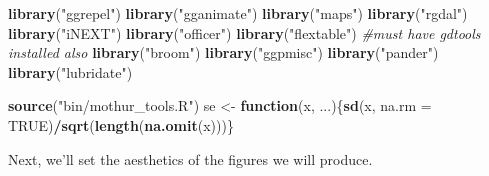 \documentclass[]{article}
\newenvironment{Shaded}{\begin{snugshade}}{\end{snugshade}}
\newcommand{\KeywordTok}[1]{\textcolor[rgb]{0.13,0.29,0.53}{\textbf{#1}}}
\newcommand{\DataTypeTok}[1]{\textcolor[rgb]{0.13,0.29,0.53}{#1}}
\newcommand{\StringTok}[1]{\textcolor[rgb]{0.31,0.60,0.02}{#1}}
\newcommand{\CommentTok}[1]{\textcolor[rgb]{0.56,0.35,0.01}{\textit{#1}}}
\newcommand{\OtherTok}[1]{\textcolor[rgb]{0.56,0.35,0.01}{#1}}
\newcommand{\ControlFlowTok}[1]{\textcolor[rgb]{0.13,0.29,0.53}{\textbf{#1}}}
\newcommand{\OperatorTok}[1]{\textcolor[rgb]{0.81,0.36,0.00}{\textbf{#1}}}
\newcommand{\NormalTok}[1]{#1}
\begin{document}
\begin{Shaded}
\begin{Highlighting}[]
\KeywordTok{library}\NormalTok{(}\StringTok{"ggrepel"}\NormalTok{)}
\KeywordTok{library}\NormalTok{(}\StringTok{"gganimate"}\NormalTok{)}
\KeywordTok{library}\NormalTok{(}\StringTok{"maps"}\NormalTok{)}
\KeywordTok{library}\NormalTok{(}\StringTok{"rgdal"}\NormalTok{)}
\KeywordTok{library}\NormalTok{(}\StringTok{"iNEXT"}\NormalTok{)}
\KeywordTok{library}\NormalTok{(}\StringTok{"officer"}\NormalTok{)}
\KeywordTok{library}\NormalTok{(}\StringTok{"flextable"}\NormalTok{) }\CommentTok{#must have gdtools installed also}
\KeywordTok{library}\NormalTok{(}\StringTok{"broom"}\NormalTok{)}
\KeywordTok{library}\NormalTok{(}\StringTok{"ggpmisc"}\NormalTok{)}
\KeywordTok{library}\NormalTok{(}\StringTok{"pander"}\NormalTok{)}
\KeywordTok{library}\NormalTok{(}\StringTok{"lubridate"}\NormalTok{)}

\KeywordTok{source}\NormalTok{(}\StringTok{"bin/mothur_tools.R"}\NormalTok{)}
\NormalTok{se <-}\StringTok{ }\ControlFlowTok{function}\NormalTok{(x, ...)\{}\KeywordTok{sd}\NormalTok{(x, }\DataTypeTok{na.rm =} \OtherTok{TRUE}\NormalTok{)}\OperatorTok{/}\KeywordTok{sqrt}\NormalTok{(}\KeywordTok{length}\NormalTok{(}\KeywordTok{na.omit}\NormalTok{(x)))\}}
\end{Highlighting}
\end{Shaded}

Next, we'll set the aesthetics of the figures we will produce.
\end{document}
